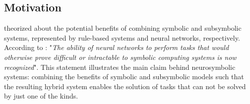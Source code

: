 \subsection{Motivation}
\cite{mcgarry_hybrid_1999} theorized about the potential benefits of combining symbolic and subsymbolic systems, represented by rule-based systems and neural networks, respectively. According to \cite{mcgarry_hybrid_1999}: "\textit{The ability of neural networks to perform tasks that would otherwise prove difficult or intractable to symbolic computing systems is now recognized}". This statement illustrates the main claim behind neurosymbolic systems: combining the benefits of symbolic and subsymbolic models such that the resulting hybrid system enables the solution of tasks that can not be solved by just one of the kinds. 


